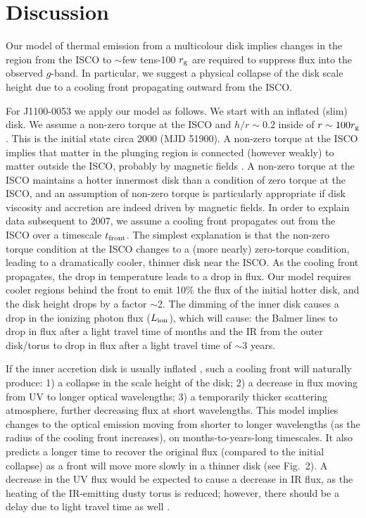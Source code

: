 \documentclass{nature}
\begin{document}
\section{Discussion}   
Our model of thermal emission from a multicolour disk implies 
changes in the region from the ISCO to $\sim$few tens-100 $r_{\rm g}$
are required to suppress flux into the observed
$g$-band. In particular, we suggest a physical collapse of the disk
scale height due to a cooling front propagating outward from the ISCO.

For J1100-0053 we apply our model as follows. We start with an
inflated (slim) disk. We assume a non-zero torque at the ISCO and
$h/r\sim0.2$ inside of $r\sim100 r_{\rm g}$. This is the initial state
circa 2000 (MJD 51900). A non-zero torque at the ISCO implies that
matter in the plunging region is connected (however weakly) to matter
outside the ISCO, probably by magnetic fields \cite[e.g.,
][]{Gammie1999, Agol_Krolik2000}. A non-zero torque at the ISCO
maintains a hotter innermost disk than a condition of zero torque at
the ISCO, and an assumption of non-zero torque is particularly
appropriate if disk viscosity and accretion are indeed driven by
magnetic fields. In order to explain data subsequent to 2007, we
assume a cooling front propagates out from the ISCO over a timescale
$t_{\rm front}$. The simplest explanation is that the non-zero torque
condition at the ISCO changes to a (more nearly) zero-torque
condition, leading to a dramatically cooler, thinner disk near the
ISCO. As the cooling front propagates, the drop in temperature leads
to a drop in flux. Our model requires cooler regions behind the front
to emit 10\% the flux of the initial hotter disk, and the disk height
drops by a factor $\sim$2. The dimming of the inner disk causes a drop
in the ionizing photon flux ($L_{\rm ion}$), which will cause: the
Balmer lines to drop in flux after a light travel time of months and
the IR from the outer disk/torus to drop in flux after a light travel
time of $\sim$3 years.

If the inner accretion disk is usually inflated \cite[see e.g.,
][]{Sirko_Goodman2003, Thompson2005, Hopkins_Quataert2011}, such a
cooling front will naturally produce: 1) a collapse in the scale
height of the disk; 2) a decrease in flux moving from UV to longer
optical wavelengths; 3) a temporarily thicker scattering atmosphere,
further decreasing flux at short wavelengths.  This model implies
changes to the optical emission moving from shorter to longer
wavelengths (as the radius of the cooling front increases), on
months-to-years-long timescales. It also predicts a longer time to
recover the original flux (compared to the initial collapse) as a
front will move more slowly in a thinner disk (see Fig.~2). A decrease
in the UV flux would be expected to cause a decrease in IR flux, as
the heating of the IR-emitting dusty torus is reduced; however, there
should be a delay due to light travel time as well \cite[e.g.,
][]{Jun2015}.
\end{document}
